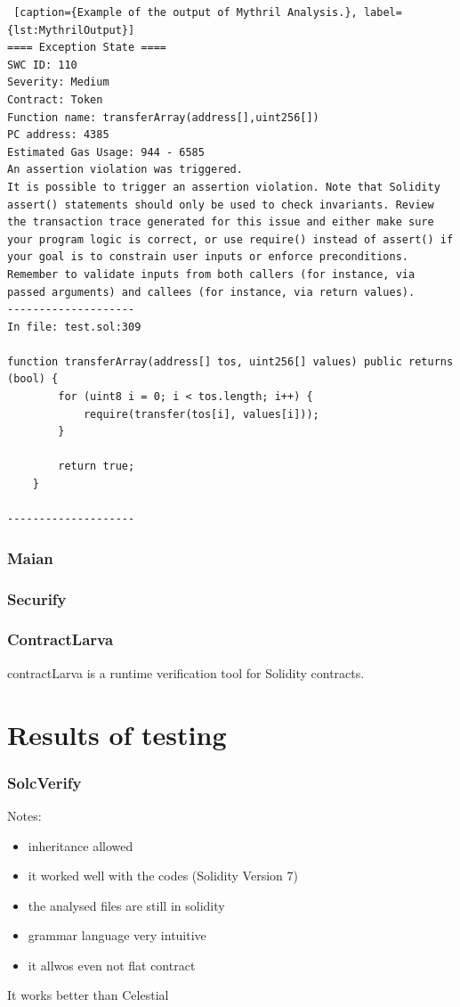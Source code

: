 \begin{lstlisting} [caption={Example of the output of Mythril Analysis.}, label={lst:MythrilOutput}]
==== Exception State ====
SWC ID: 110
Severity: Medium
Contract: Token
Function name: transferArray(address[],uint256[])
PC address: 4385
Estimated Gas Usage: 944 - 6585
An assertion violation was triggered.
It is possible to trigger an assertion violation. Note that Solidity assert() statements should only be used to check invariants. Review the transaction trace generated for this issue and either make sure your program logic is correct, or use require() instead of assert() if your goal is to constrain user inputs or enforce preconditions. Remember to validate inputs from both callers (for instance, via passed arguments) and callees (for instance, via return values).
--------------------
In file: test.sol:309

function transferArray(address[] tos, uint256[] values) public returns (bool) {
        for (uint8 i = 0; i < tos.length; i++) {
            require(transfer(tos[i], values[i]));
        }

        return true;
    }

--------------------

\end{lstlisting}

\subsection{Maian}
\label{sec:WithoutSpecification:Maian}

\subsection{Securify}
\label{sec:WithoutSpecification:Securify}

\subsection{ContractLarva}
\label{sec:WithoutSpecification:ContractLarva}
contractLarva is a runtime verification tool for Solidity contracts. 

\chapter{Results of testing}
\label{ch:Results}

\subsection{SolcVerify}
Notes:
\begin{itemize}
    \item inheritance allowed 
    \item it worked well with the codes (Solidity Version 7)
    \item the analysed files are still in solidity 
    \item grammar language very intuitive 
    \item it allwos even not flat contract 
\end{itemize}
It works better than Celestial 

